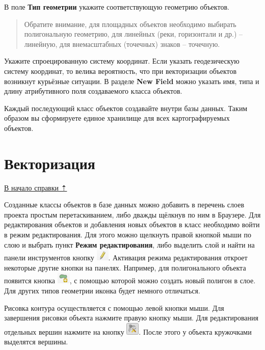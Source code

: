 \documentclass[
  12pt,
]{book}
\begin{document}
В поле \textbf{Тип геометрии} укажите соответствующую геометрию объектов.

\begin{quote}
Обратите внимание, для площадных объектов необходимо выбирать полигональную геометрию, для линейных (реки, горизонтали и др.) -- линейную, для внемасштабных (точечных) знаков -- точечную.
\end{quote}

Укажите спроецированную систему координат. Если указать геодезическую систему координат, то велика вероятность, что при векторизации объектов возникнут курьёзные ситуации.
В разделе \textbf{New Field} можно указать имя, типа и длину атрибутивного поля создаваемого класса объектов.

Каждый последующий класс объектов создавайте внутри базы данных. Таким образом вы сформируете единое хранилище для всех картографируемых объектов.

\section{Векторизация}\label{digitize-vectorize}

\hyperref[digitize]{В начало справки ⇡}

Созданные классы объектов в базе данных можно добавить в перечень слоев проекта простым перетаскиванием, либо дважды щёлкнув по ним в Браузере. Для редактирования объектов и добавления новых объектов в класс необходимо войти в режим редактирования. Для этого можно щелкнуть правой кнопкой мыши по слою и выбрать пункт \textbf{Режим редактирования}, либо выделить слой и найти на панели инструментов кнопку \includegraphics{images/vector/Edit.png}. Активация режима редактирования откроет некоторые другие кнопки на панелях. Например, для полигонального объекта появится кнопка \includegraphics{images/vector/New_polygon.png}, с помощью которой можно создать новый полигон в слое. Для других типов геометрии иконка будет немного отличаться.

Рисовка контура осуществляется с помощью левой кнопки мыши. Для завершения рисовки объекта нажмите правую кнопку мыши. Для редактирования отдельных вершин нажмите на кнопку \includegraphics{images/vector/Vertices.png}. После этого у объекта кружочками выделятся вершины.
\end{document}
